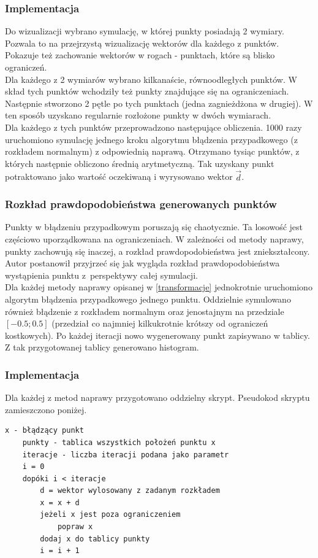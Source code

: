 \documentclass{mini}
\begin{document}
\subsubsection*{Implementacja}
Do wizualizacji wybrano symulację, w której punkty posiadają 2 wymiary. Pozwala to na przejrzystą wizualizację wektorów dla każdego z punktów. Pokazuje też zachowanie wektorów w rogach - punktach, które są blisko ograniczeń.\\
Dla każdego z 2 wymiarów wybrano kilkanaście, równoodległych punktów. W skład tych punktów wchodziły też punkty znajdujące się na ograniczeniach. Następnie stworzono 2 pętle po tych punktach (jedna zagnieżdżona w drugiej). W ten sposób uzyskano regularnie rozłożone punkty w dwóch wymiarach.\\
Dla każdego z tych punktów przeprowadzono następujące obliczenia. 1000 razy uruchomiono symulację jednego kroku algorytmu błądzenia przypadkowego (z rozkładem normalnym) z odpowiednią naprawą. Otrzymano tysiąc punktów, z których następnie obliczono średnią arytmetyczną. Tak uzyskany punkt potraktowano jako wartość oczekiwaną i wyrysowano wektor $\overrightarrow{d}$.

\subsubsection{Rozkład prawdopodobieństwa generowanych punktów}
Punkty w błądzeniu przypadkowym poruszają się chaotycznie. Ta losowość jest częściowo uporządkowana na ograniczeniach. W zależności od metody naprawy, punkty zachowują się inaczej, a rozkład prawdopodobieństwa jest zniekształcony. Autor postanowił przyjrzeć się jak wygląda rozkład prawdopodobieństwa wystąpienia punktu z~perspektywy całej symulacji.\\
Dla każdej metody naprawy opisanej w \ref{transformacje} jednokrotnie uruchomiono algorytm błądzenia przypadkowego jednego punktu. Oddzielnie symulowano również błądzenie z rozkładem normalnym oraz jenostajnym na przedziale $[-0.5; 0.5]$ (przedział co najmniej kilkukrotnie krótszy od ograniczeń kostkowych). Po każdej iteracji nowo wygenerowany punkt zapisywano w tablicy. Z tak przygotowanej tablicy generowano histogram.

\subsubsection*{Implementacja}
Dla każdej z metod naprawy przygotowano oddzielny skrypt. Pseudokod skryptu zamieszczono poniżej.
\begin{Verbatim}[baselinestretch=1.1]
	x - błądzący punkt
	punkty - tablica wszystkich położeń punktu x
	iteracje - liczba iteracji podana jako parametr
	i = 0
	dopóki i < iteracje
		d = wektor wylosowany z zadanym rozkładem
		x = x + d
		jeżeli x jest poza ograniczeniem
			popraw x
		dodaj x do tablicy punkty
		i = i + 1
\end{Verbatim}
\end{document}
